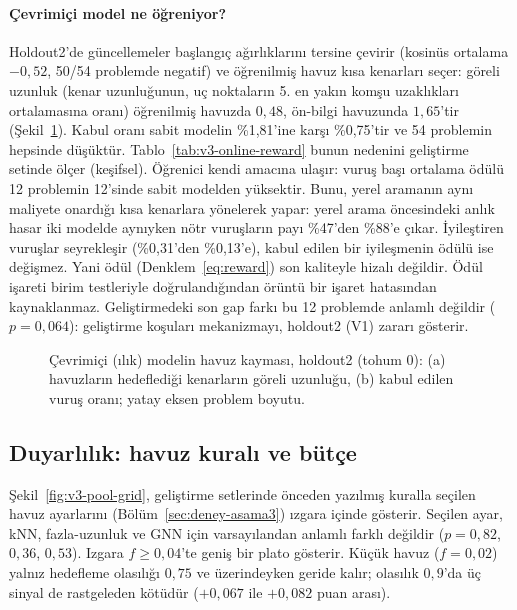

\paragraph{Çevrimiçi model ne öğreniyor?}
Holdout2'de güncellemeler başlangıç ağırlıklarını tersine çevirir (kosinüs ortalama $-0{,}52$,
50/54 problemde negatif) ve öğrenilmiş havuz kısa kenarları seçer: göreli uzunluk (kenar
uzunluğunun, uç noktaların 5. en yakın komşu uzaklıkları ortalamasına oranı) öğrenilmiş havuzda
$0{,}48$, ön-bilgi havuzunda $1{,}65$'tir (Şekil~\ref{fig:v3-online-drift}).
Kabul oranı sabit modelin \%1,81'ine karşı \%0,75'tir ve 54 problemin hepsinde düşüktür.
Tablo~\ref{tab:v3-online-reward} bunun nedenini geliştirme setinde ölçer (keşifsel). Öğrenici kendi
amacına ulaşır: vuruş başı ortalama ödülü 12 problemin 12'sinde sabit modelden yüksektir.
Bunu, yerel aramanın aynı maliyete onardığı kısa kenarlara yönelerek yapar: yerel arama öncesindeki
anlık hasar iki modelde aynıyken nötr vuruşların payı \%47'den \%88'e çıkar.
İyileştiren vuruşlar seyrekleşir (\%0,31'den \%0,13'e), kabul edilen bir iyileşmenin ödülü ise
değişmez.
Yani ödül (Denklem~\eqref{eq:reward}) son kaliteyle hizalı değildir. Ödül işareti birim testleriyle
doğrulandığından örüntü bir işaret hatasından kaynaklanmaz.
Geliştirmedeki son gap farkı bu 12 problemde anlamlı değildir ($p=0{,}064$): geliştirme koşuları
mekanizmayı, holdout2 (V1) zararı gösterir.



\begin{figure}[!htbp]
\centering

\caption{Çevrimiçi (ılık) modelin havuz kayması, holdout2 (tohum 0): (a) havuzların hedeflediği kenarların göreli uzunluğu, (b) kabul edilen vuruş oranı; yatay eksen problem boyutu.}
\label{fig:v3-online-drift}
\end{figure}

\subsection{Duyarlılık: havuz kuralı ve bütçe}\label{sec:bulgular-duyarlilik}

Şekil~\ref{fig:v3-pool-grid}, geliştirme setlerinde önceden yazılmış kuralla seçilen havuz
ayarlarını (Bölüm~\ref{sec:deney-asama3}) ızgara içinde gösterir. Seçilen ayar, kNN, fazla-uzunluk
ve GNN için varsayılandan anlamlı farklı değildir ($p=0{,}82$, $0{,}36$, $0{,}53$).
Izgara $f\ge0{,}04$'te geniş bir plato gösterir. Küçük havuz ($f=0{,}02$) yalnız hedefleme olasılığı
$0{,}75$ ve üzerindeyken geride kalır; olasılık $0{,}9$'da üç sinyal de rastgeleden kötüdür
($+0{,}067$ ile $+0{,}082$ puan arası).

